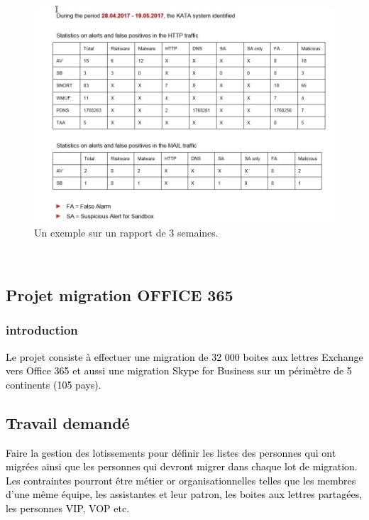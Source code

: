 		 		 
\begin{figure}[H]
	\begin{center}
		\includegraphics[width=1\linewidth]{Projet_KATA/rapport_ksy}
\end{center}
	\caption{Un exemple sur un rapport de 3 semaines.}
	\label{fig:12}	
\end{figure}	
~~\\

\subsection{Projet migration OFFICE 365}
\subsubsection*{introduction}

\textcolor{black}{Le projet consiste à effectuer une migration de 32 000 boites aux lettres Exchange vers Office 365 et aussi une migration Skype for Business sur un périmètre de 5 continents (105 pays).}

\subsection*{Travail demandé	}


\textcolor{black}{Faire la gestion des lotissements pour définir les listes des personnes qui ont migrées ainsi que les personnes qui devront migrer dans chaque lot de migration.
Les contraintes pourront être métier or organisationnelles telles que les membres d’une même équipe, les assistantes et leur patron, les boites aux lettres partagées, les personnes VIP, VOP etc.}

